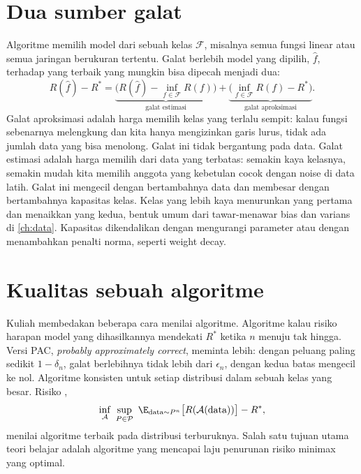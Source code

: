 \section{Dua sumber galat}

Algoritme memilih model dari sebuah kelas $\mathcal F$, misalnya semua fungsi linear atau semua jaringan berukuran tertentu.
Galat berlebih model yang dipilih, $\hat f$, terhadap yang terbaik yang mungkin bisa dipecah menjadi dua:
\begin{equation}
R(\hat f)-R^*=\underbrace{\Big(R(\hat f)-\inf_{f\in\mathcal F}R(f)\Big)}_{\text{galat estimasi}}
+\underbrace{\Big(\inf_{f\in\mathcal F}R(f)-R^*\Big)}_{\text{galat aproksimasi}}.
\end{equation}
Galat aproksimasi adalah harga memilih kelas yang terlalu sempit: kalau fungsi sebenarnya melengkung dan kita hanya mengizinkan
garis lurus, tidak ada jumlah data yang bisa menolong. Galat ini tidak bergantung pada data. Galat estimasi adalah harga memilih
dari data yang terbatas: semakin kaya kelasnya, semakin mudah kita memilih anggota yang kebetulan cocok dengan noise di data latih.
Galat ini mengecil dengan bertambahnya data dan membesar dengan bertambahnya kapasitas kelas. Kelas yang lebih kaya menurunkan
yang pertama dan menaikkan yang kedua, bentuk umum dari tawar-menawar bias dan varians di \cref{ch:data}. Kapasitas dikendalikan
dengan mengurangi parameter atau dengan menambahkan penalti norma, seperti weight decay.

\section{Kualitas sebuah algoritme}

Kuliah membedakan beberapa cara menilai algoritme. Algoritme  kalau risiko harapan model yang dihasilkannya
mendekati $R^*$ ketika $n$ menuju tak hingga. Versi PAC, \emph{probably approximately correct}, meminta lebih: dengan peluang
paling sedikit $1-\delta_n$, galat berlebihnya tidak lebih dari $\epsilon_n$, dengan kedua batas mengecil ke nol. Algoritme
 konsisten untuk setiap distribusi dalam sebuah kelas yang besar. Risiko ,
\begin{equation}
\inf_{\mathcal A}\ \sup_{P\in\mathcal P}\ \E_{\text{data}\sim P^n}\big[R(\mathcal A(\text{data}))\big]-R^*,
\end{equation}
menilai algoritme terbaik pada distribusi terburuknya. Salah satu tujuan utama teori belajar adalah algoritme yang mencapai laju
penurunan risiko minimax yang optimal.

